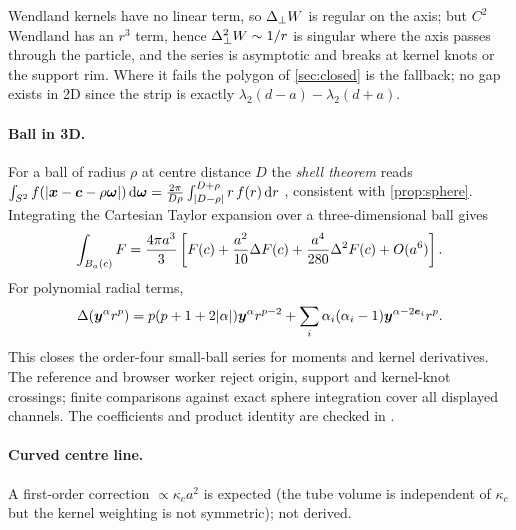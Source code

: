 \begin{remark}[Regularity]
Wendland kernels have no linear term, so $\Delta_\perp W$ is regular on the axis; but $C^2$ Wendland has an $r^3$ term, hence $\Delta_\perp^2W\sim1/r$
is singular where the axis passes through the particle, and the series is asymptotic and breaks at kernel knots or the support rim. Where it fails the
polygon of \cref{sec:closed} is the fallback; no gap exists in 2D since the strip is exactly $\lambda_2(d-a)-\lambda_2(d+a)$.
\end{remark}

\paragraph{Ball in 3D.} For a ball of radius $\rho$ at centre distance $D$ the \emph{shell theorem} reads
$\int_{S^2}f(|\bm x-\bm c-\rho\bm\omega|)\,\mathrm{d}\bm\omega=\frac{2\pi}{D\rho}\int_{|D-\rho|}^{D+\rho}r\,f(r)\,\mathrm{d} r$ , consistent with \cref{prop:sphere}.
Integrating the Cartesian Taylor expansion over a three-dimensional ball gives
\[
 \int_{B_a(c)}F=\frac{4\pi a^3}{3}
 \left[F(c)+\frac{a^2}{10}\Delta F(c)+\frac{a^4}{280}\Delta^2F(c)+O(a^6)\right].
\]
For polynomial radial terms,
\[
 \Delta(\bm y^\alpha r^p)=p(p+1+2|\alpha|)\bm y^\alpha r^{p-2}
 +\sum_i\alpha_i(\alpha_i-1)\bm y^{\alpha-2\bm e_i}r^p.
\]
This closes the order-four small-ball series for moments and kernel
derivatives. The reference and browser worker reject origin, support and
kernel-knot crossings; finite comparisons against exact sphere integration
cover all displayed channels. The coefficients and product identity are
checked in . 

\paragraph{Curved centre line.} A first-order correction $\propto\kappa_ca^2$ is expected (the tube volume is independent of $\kappa_c$ but the kernel weighting is not
symmetric); not derived. 
